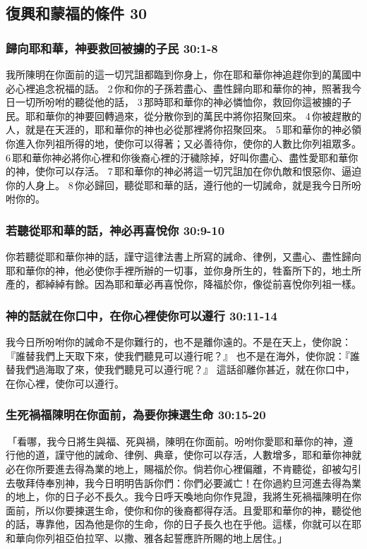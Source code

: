 \subsection{復興和蒙福的條件 30 }
\subsubsection{歸向耶和華，神要救回被擄的子民 30:1-8}
我所陳明在你面前的這一切咒詛都臨到你身上，你在耶和華你神追趕你到的萬國中必心裡追念祝福的話。 2 你和你的子孫若盡心、盡性歸向耶和華你的神，照著我今日一切所吩咐的聽從他的話， 3 那時耶和華你的神必憐恤你，救回你這被擄的子民。耶和華你的神要回轉過來，從分散你到的萬民中將你招聚回來。 4 你被趕散的人，就是在天涯的，耶和華你的神也必從那裡將你招聚回來。 5 耶和華你的神必領你進入你列祖所得的地，使你可以得著；又必善待你，使你的人數比你列祖眾多。 6 耶和華你神必將你心裡和你後裔心裡的汙穢除掉，好叫你盡心、盡性愛耶和華你的神，使你可以存活。 7 耶和華你的神必將這一切咒詛加在你仇敵和恨惡你、逼迫你的人身上。 8 你必歸回，聽從耶和華的話，遵行他的一切誡命，就是我今日所吩咐你的。

\subsubsection{若聽從耶和華的話，神必再喜悅你 30:9-10}
你若聽從耶和華你神的話，謹守這律法書上所寫的誡命、律例，又盡心、盡性歸向耶和華你的神，他必使你手裡所辦的一切事，並你身所生的，牲畜所下的，地土所產的，都綽綽有餘。因為耶和華必再喜悅你，降福於你，像從前喜悅你列祖一樣。

\subsubsection{神的話就在你口中，在你心裡使你可以遵行 30:11-14}
我今日所吩咐你的誡命不是你難行的，也不是離你遠的。不是在天上，使你說：『誰替我們上天取下來，使我們聽見可以遵行呢？』 也不是在海外，使你說：『誰替我們過海取了來，使我們聽見可以遵行呢？』 這話卻離你甚近，就在你口中，在你心裡，使你可以遵行。

\subsubsection{生死禍福陳明在你面前，為要你揀選生命 30:15-20}
 「看哪，我今日將生與福、死與禍，陳明在你面前。吩咐你愛耶和華你的神，遵行他的道，謹守他的誡命、律例、典章，使你可以存活，人數增多，耶和華你神就必在你所要進去得為業的地上，賜福於你。倘若你心裡偏離，不肯聽從，卻被勾引去敬拜侍奉別神，我今日明明告訴你們：你們必要滅亡！在你過約旦河進去得為業的地上，你的日子必不長久。我今日呼天喚地向你作見證，我將生死禍福陳明在你面前，所以你要揀選生命，使你和你的後裔都得存活。且愛耶和華你的神，聽從他的話，專靠他，因為他是你的生命，你的日子長久也在乎他。這樣，你就可以在耶和華向你列祖亞伯拉罕、以撒、雅各起誓應許所賜的地上居住。」


